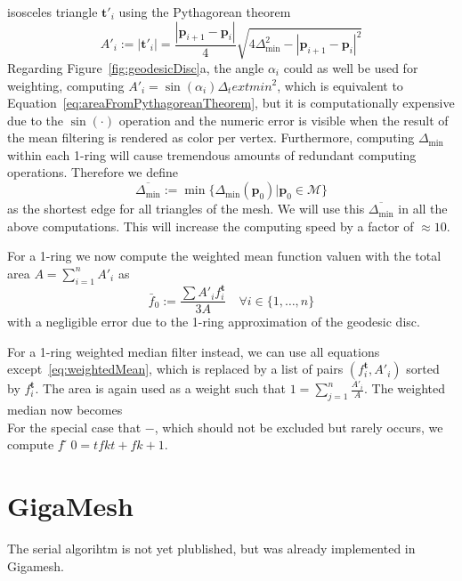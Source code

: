 \documentclass[openany]{book}
\newcommand{\bp}{\mathbf{p}}
\begin{document}
isosceles triangle $\mathbf{t}'_i$ using the Pythagorean theorem
\begin{equation}
	A'_i := |\mathbf{t}'_i| = \frac{|\bp_{i+1} - \bp_i|}{4}
	\sqrt{4\Delta_\text{min}^2 - |\bp_{i+1} - \bp_i|^2}
	\label{eq:areaFromPythagoreanTheorem}
\end{equation}
Regarding Figure~\ref{fig:geodesicDisc}a, the angle $\alpha_i$ could as well be 
used for weighting, computing $A'_i = \sin(\alpha_i)\Delta_text{min}^2$, which is 
equivalent to Equation~\ref{eq:areaFromPythagoreanTheorem}, but it 
is computationally expensive due to the $\sin(\cdot)$ operation and the numeric error 
is visible when the result of the mean filtering is rendered as color per 
vertex. Furthermore, computing $\Delta_\text{min}$ within each 1-ring will cause 
tremendous amounts of redundant computing operations. Therefore we define 
\begin{equation}
	\overline{\Delta_\text{min}} := \min\{\Delta_\text{min}(\bp_0) | 
	\bp_0 \in \mathcal{M}\}
\end{equation} 
as the shortest edge for all triangles of the mesh. We will use this 
$\overline{\Delta_\text{min}}$ in all the above computations. This will increase the 
computing speed by a factor of $\approx 10$. 

For a 1-ring we now compute the weighted mean function valuen with the total area
$A = \displaystyle\sum_{i=1}^nA'_i$ as
\begin{equation}
	\bar{f}_0 := \frac{\sum A'_if_i^\mathbf{t}}{3A} \quad \forall i \in \{1,\ldots,n\}
	\label{eq:weightedMean}
\end{equation}
with a negligible error due to the 1-ring approximation of the geodesic 
disc.

For a 1-ring weighted median filter instead, we can use all equations 
except~\ref{eq:weightedMean}, which is replaced by a list of pairs $(f_i^\mathbf{t}, 
A'_i)$ sorted by $f_i^\mathbf{t}$. The area is again used as a weight such that 
$1 = \displaystyle\sum_{j=1}^n\frac{A'_i}{A}$. The weighted median now becomes
\begin{equation}
\end{equation}
For the special case that $-$, which should not be excluded but rarely occurs, 
we compute $f  ̃ 0 =tf k t + f k+1$.~\cite[s.~3.2]{Mara17}



\section{GigaMesh}
The serial algorihtm is not yet plublished, but was already implemented in Gigamesh.
\end{document}
